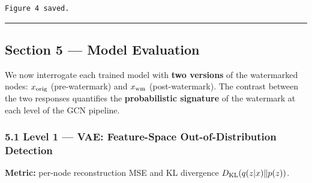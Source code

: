 \documentclass[11pt]{article}
\begin{document}
    \begin{Verbatim}[commandchars=\\\{\}]
Figure 4 saved.
    \end{Verbatim}

    \begin{center}\rule{0.5\linewidth}{0.5pt}\end{center}

\subsection{Section 5 --- Model
Evaluation}\label{section-5-model-evaluation}

We now interrogate each trained model with \textbf{two versions} of the
watermarked nodes: \(x_{\rm orig}\) (pre-watermark) and \(x_{\rm wm}\)
(post-watermark). The contrast between the two responses quantifies the
\textbf{probabilistic signature} of the watermark at each level of the
GCN pipeline.

    \subsubsection{5.1 Level 1 --- VAE: Feature-Space Out-of-Distribution
Detection}\label{level-1-vae-feature-space-out-of-distribution-detection}

\textbf{Metric:} per-node reconstruction MSE and KL divergence
\(D_{\rm KL}(q(z|x)\|p(z))\).
\end{document}
